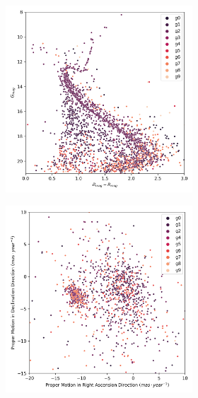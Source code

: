 \documentclass[11pt, a4paper, english]{book}
\begin{document}
\begin{figure}[H]
\begin{subfigure}{0.9\textwidth}
\begin{subfigure}[t]{0.30\textwidth}
    \end{subfigure}
    \hfill
    \begin{subfigure}[t]{0.30\textwidth}
      \centering
      \includegraphics[width=\textwidth]{../figures/ngc_2682/dec_hr_diagram_ngc_2682.png}
    \end{subfigure}
  \end{subfigure}
  \caption{NGC 2682 DEC characterization. Identified as cluster \emph{g2}.}
  \label{fig:result_ngc_2682_dec}
  \centering
  \begin{subfigure}{0.9\textwidth}
    \centering
    \begin{subfigure}[t]{0.30\textwidth}
      \centering
      \includegraphics[width=\textwidth]{../figures/ngc_2682/dec_pm_filtered_ngc_2682.png}

\end{subfigure}
\end{subfigure}
\end{figure}
\end{document}
